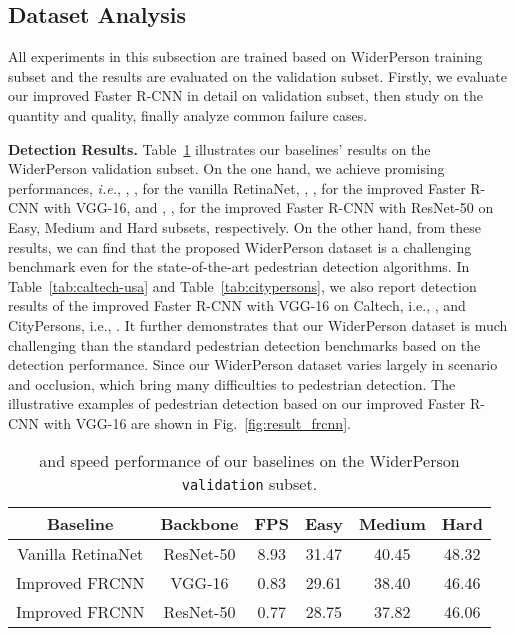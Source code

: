 \documentclass[journal]{IEEEtran}
\def\ie{{\em i.e.}}
\begin{document}
\subsection{Dataset Analysis}\label{sec:exp_ana}
All experiments in this subsection are trained based on WiderPerson training subset and the results are evaluated on the validation subset. Firstly, we evaluate our improved Faster R-CNN in detail on validation subset, then study on the quantity and quality, finally analyze common failure cases.

{\flushleft \textbf{Detection Results. }}
Table~\ref{tab:eval-frcnn} illustrates our baselines' results on the WiderPerson validation subset. On the one hand, we achieve promising  performances, \ie, , ,  for the vanilla RetinaNet, , ,  for the improved Faster R-CNN with VGG-16, and , ,  for the improved Faster R-CNN with ResNet-50 on Easy, Medium and Hard subsets, respectively. On the other hand, from these results, we can find that the proposed WiderPerson dataset is a challenging benchmark even for the state-of-the-art pedestrian detection algorithms. In Table~\ref{tab:caltech-usa} and Table~\ref{tab:citypersons}, we also report detection results of the improved Faster R-CNN with VGG-16 on Caltech, i.e.,  , and CityPersons, i.e.,  . It further demonstrates that our WiderPerson dataset is much challenging than the standard pedestrian detection benchmarks based on the detection performance. Since our WiderPerson dataset varies largely in scenario and occlusion, which bring many difficulties to pedestrian detection. The illustrative examples of pedestrian detection based on our improved Faster R-CNN with VGG-16 are shown in Fig.~\ref{fig:result_frcnn}.

\begin{table}[t]
\centering
\caption{ and speed performance of our baselines on the WiderPerson {\tt validation} subset.}
\label{tab:eval-frcnn}
\setlength{\tabcolsep}{6.5pt}
\begin{tabular}{cccccc}
\toprule[2pt]
Baseline &Backbone &FPS & Easy & Medium & Hard \\
\midrule
Vanilla RetinaNet & ResNet-50 &8.93 & {31.47} & {40.45} & {48.32} \\
Improved FRCNN & VGG-16 &0.83 & {29.61} & {38.40} & {46.46} \\
Improved FRCNN & ResNet-50 &0.77 & {28.75} & {37.82} & {46.06} \\
\bottomrule[2pt]
\end{tabular}
\end{table}
\end{document}
